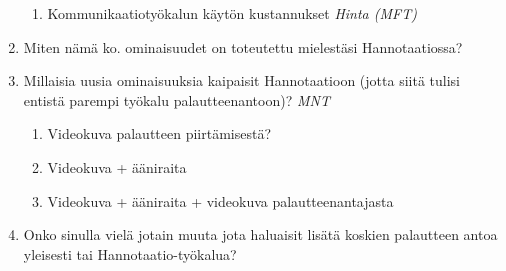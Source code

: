 \documentclass[english,12pt,a4paper,pdftex]{article}
\begin{document}
\begin{enumerate}
\begin{enumerate}
    \item Kommunikaatiotyökalun käytön kustannukset \textit{Hinta (MFT)}
    
  \end{enumerate}
  
\item Miten nämä ko. ominaisuudet on toteutettu mielestäsi Hannotaatiossa?
  
\item Millaisia uusia ominaisuuksia kaipaisit Hannotaatioon (jotta siitä tulisi entistä parempi työkalu palautteenantoon)? \textit{MNT}
  \begin{enumerate}
    \item Videokuva palautteen piirtämisestä?
    \item Videokuva + ääniraita
    \item Videokuva + ääniraita + videokuva palautteenantajasta
  \end{enumerate}

\item Onko sinulla vielä jotain muuta jota haluaisit lisätä koskien palautteen antoa yleisesti tai Hannotaatio-työkalua?
  
\end{enumerate}

\clearpage
\end{document}
